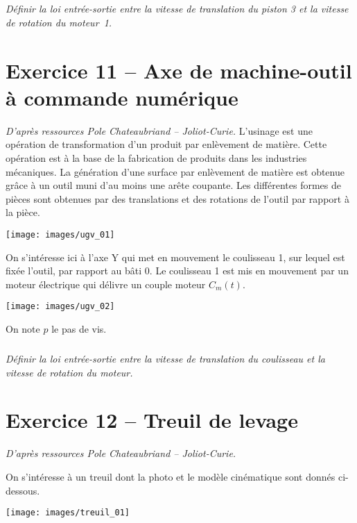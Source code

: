 \documentclass[10pt,fleqn]{article} %
\begin{document}
\begin{multicols}{2}
\begin{multicols}{2}
\subparagraph{}
\textit{Définir la loi entrée-sortie entre la vitesse de translation du piston 3 et la vitesse de rotation du moteur~1. }

\ifprof
\begin{corrige}
\end{corrige}
\else
\fi


\section*{Exercice 11 -- Axe de machine-outil à commande numérique}
\textit{D'après ressources Pole Chateaubriand -- Joliot-Curie.}
\setcounter{exo}{0}
L’usinage est une opération de transformation d’un produit par enlèvement de matière.
Cette opération est à la base de la fabrication de produits dans les industries mécaniques.
La génération d’une surface par enlèvement de matière est obtenue grâce à un outil muni
d’au moins une arête coupante. Les différentes formes de pièces sont obtenues par des
translations et des rotations de l'outil par rapport à la pièce.

\begin{center}
\texttt{[image: images/ugv\_01]}
\end{center}

On s’intéresse ici à l’axe Y qui met en mouvement le coulisseau 1,
sur lequel est fixée l’outil, par rapport au bâti 0. Le coulisseau 1 est mis en mouvement par un moteur
électrique qui délivre un couple moteur $C_m(t)$.

\begin{center}
\texttt{[image: images/ugv\_02]}
\end{center}

On note $p$ le pas de vis. 


\subparagraph{}
\textit{Définir la loi entrée-sortie entre la vitesse de translation du coulisseau et la vitesse de rotation du moteur. }
\ifprof
\begin{corrige}
\end{corrige}
\else
\fi


\section*{Exercice 12 -- Treuil de levage}
\textit{D'après ressources Pole Chateaubriand -- Joliot-Curie.}
\setcounter{exo}{0}

On s’intéresse à un treuil dont la photo et le modèle cinématique sont donnés ci-dessous.
\begin{center}
\texttt{[image: images/treuil\_01]}
\end{center}


\end{multicols}
\end{multicols}
\end{document}

